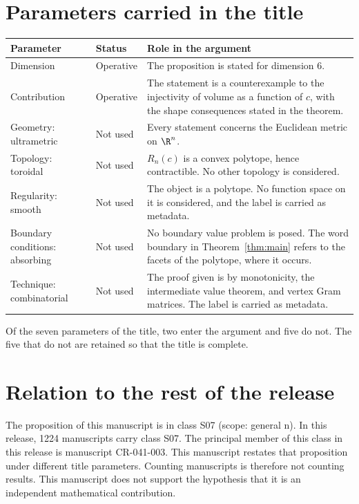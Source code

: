 \documentclass[11pt]{article}
\begin{document}
\section{Parameters carried in the title}\label{sec:params}
\begin{center}
\small
\begin{tabular}{p{}p{}p{}}
\toprule
Parameter & Status & Role in the argument \\
\midrule
Dimension & Operative & The proposition is stated for dimension $6$. \\
Contribution & Operative & The statement is a counterexample to the injectivity of volume as a function of $c$, with the shape consequences stated in the theorem. \\
Geometry: ultrametric & Not used & Every statement concerns the Euclidean metric on $\R^n$. \\
Topology: toroidal & Not used & $R_n(c)$ is a convex polytope, hence contractible. No other topology is considered. \\
Regularity: smooth & Not used & The object is a polytope. No function space on it is considered, and the label is carried as metadata. \\
Boundary conditions: absorbing & Not used & No boundary value problem is posed. The word boundary in Theorem~\ref{thm:main} refers to the facets of the polytope, where it occurs. \\
Technique: combinatorial & Not used & The proof given is by monotonicity, the intermediate value theorem, and vertex Gram matrices. The label is carried as metadata. \\
\bottomrule
\end{tabular}
\end{center}
Of the seven parameters of the title, two enter the argument and five do not. The five that do not are retained so that the title is complete.

\section{Relation to the rest of the release}
The proposition of this manuscript is in class S07 (scope: general n).
In this release, 1224 manuscripts carry class S07. The principal member of this class in this release is manuscript CR-041-003. This manuscript restates that proposition under different title parameters.
Counting manuscripts is therefore not counting results. This manuscript does not support the hypothesis that it is an independent mathematical contribution.
\end{document}
